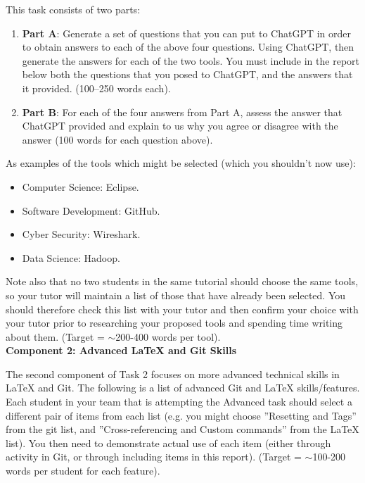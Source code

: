 \documentclass[a4paper, 11pt]{report}
\begin{document}
{{This task consists of two parts:

\begin{enumerate}
\item \textbf{Part A}: Generate a set of questions that you can put to ChatGPT in order to obtain answers to each of the above four questions. Using ChatGPT, then generate the answers for each of the two tools. You must include in the report below both the questions that you posed to ChatGPT, and the answers that it provided.  (100–250 words each).
\item \textbf{Part B}: For each of the four answers from Part A, assess the answer that ChatGPT provided and explain to us why you agree or disagree with the answer (100 words for each question above).
\end{enumerate}


As examples of the tools which might be selected (which you shouldn’t now use):
\begin{itemize}
\item Computer Science: Eclipse.
\item Software Development: GitHub. 
\item Cyber Security: Wireshark. 
\item Data Science: Hadoop.
\end{itemize}

Note also that no two students in the same tutorial should choose the same tools, so your tutor will maintain a list of those that have already been selected. You should therefore check this list with your tutor and then confirm your choice with your tutor prior to researching your proposed tools and spending time writing about them. (Target = $\sim$200-400 words per tool).\\[2mm]

\textbf{Component 2: Advanced LaTeX and Git Skills}

The second component of Task 2 focuses on more advanced technical skills in LaTeX and Git. The following is a list of advanced Git and LaTeX skills/features. Each student in your team that is attempting the Advanced task should select a different pair of items from each list (e.g. you might choose ''Resetting and Tags'' from the git list, and ''Cross-referencing and Custom commands'' from the LaTeX list). You then need to demonstrate actual use of each item (either through activity in Git, or through including items in this report). (Target = $\sim$100-200 words per student for each feature).

}}
\end{document}
